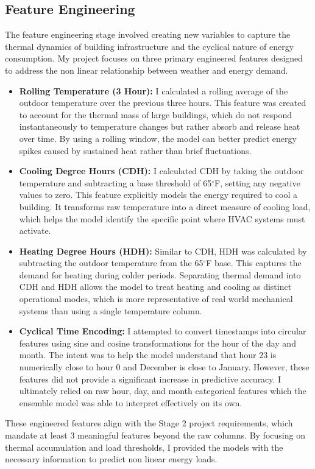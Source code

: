 \documentclass[conference]{IEEEtran}
\begin{document}
\subsection{Feature Engineering}
The feature engineering stage involved creating new variables to capture the thermal dynamics of building infrastructure and the cyclical nature of energy consumption. My project focuses on three primary engineered features designed to address the non linear relationship between weather and energy demand.
\begin{itemize}
\item \textbf{Rolling Temperature (3 Hour):} I calculated a rolling average of the outdoor temperature over the previous three hours. This feature was created to account for the thermal mass of large buildings, which do not respond instantaneously to temperature changes but rather absorb and release heat over time. By using a rolling window, the model can better predict energy spikes caused by sustained heat rather than brief fluctuations.
\item \textbf{Cooling Degree Hours (CDH):} I calculated CDH by taking the outdoor temperature and subtracting a base threshold of 65$^{\circ}$F, setting any negative values to zero. This feature explicitly models the energy required to cool a building. It transforms raw temperature into a direct measure of cooling load, which helps the model identify the specific point where HVAC systems must activate. 
\item \textbf{Heating Degree Hours (HDH):} Similar to CDH, HDH was calculated by subtracting the outdoor temperature from the 65$^{\circ}$F base. This captures the demand for heating during colder periods. Separating thermal demand into CDH and HDH allows the model to treat heating and cooling as distinct operational modes, which is more representative of real world mechanical systems than using a single temperature column.
\item \textbf{Cyclical Time Encoding:} I attempted to convert timestamps into circular features using sine and cosine transformations for the hour of the day and month. The intent was to help the model understand that hour 23 is numerically close to hour 0 and December is close to January. However, these features did not provide a significant increase in predictive accuracy. I ultimately relied on raw hour, day, and month categorical features which the ensemble model was able to interpret effectively on its own.
\end{itemize}
These engineered features align with the Stage 2 project requirements, which mandate at least 3 meaningful features beyond the raw columns. By focusing on thermal accumulation and load thresholds, I provided the models with the necessary information to predict non linear energy loads.
\end{document}
